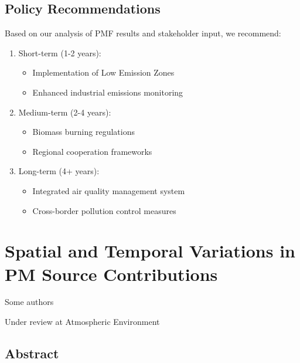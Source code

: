 \documentclass[
  letterpaper,
  oneside,
  openany]{MastersDoctoralThesis}
\providecommand{\tightlist}{%
  \setlength{\itemsep}{0pt}\setlength{\parskip}{0pt}}\usepackage{longtable,booktabs,array}
\begin{document}
\section{Policy Recommendations}\label{policy-recommendations}

Based on our analysis of PMF results and stakeholder input, we
recommend:

\begin{enumerate}
\def\labelenumi{\arabic{enumi}.}
\tightlist
\item
  Short-term (1-2 years):

  \begin{itemize}
  \tightlist
  \item
    Implementation of Low Emission Zones
  \item
    Enhanced industrial emissions monitoring
  \end{itemize}
\item
  Medium-term (2-4 years):

  \begin{itemize}
  \tightlist
  \item
    Biomass burning regulations
  \item
    Regional cooperation frameworks
  \end{itemize}
\item
  Long-term (4+ years):

  \begin{itemize}
  \tightlist
  \item
    Integrated air quality management system
  \item
    Cross-border pollution control measures
  \end{itemize}
\end{enumerate}


\chapter{Spatial and Temporal Variations in PM Source
Contributions}\label{sec-ch4}

\begin{center}
Some authors

\end{center}

Under review at Atmospheric Environment

\section{Abstract}\label{abstract-2}
\end{document}
